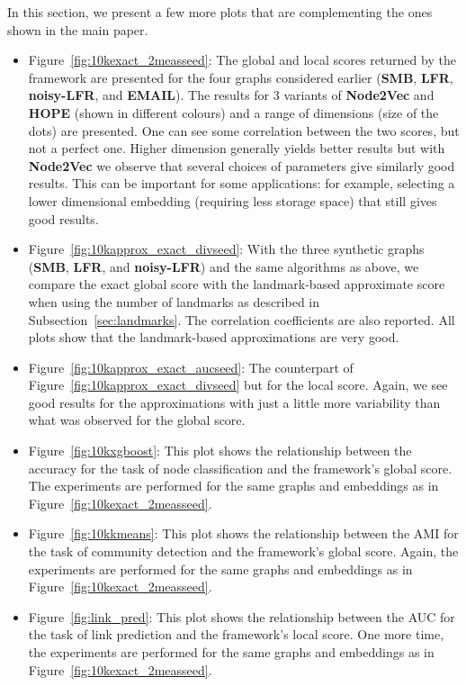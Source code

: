 In this section, we present a few more plots that are complementing the ones shown in the main paper. 
\begin{itemize}
    \item Figure~\ref{fig:10kexact_2measseed}: The global and local scores returned by the framework are presented for the four graphs considered earlier (\textbf{SMB}, \textbf{LFR}, \textbf{noisy-LFR}, and \textbf{EMAIL}). The results for 3 variants of \textbf{Node2Vec} and \textbf{HOPE} (shown in different colours) and a range of dimensions (size of the dots) are presented. One can see some correlation between the two scores, but not a perfect one. Higher dimension generally yields better results but with \textbf{Node2Vec} we observe that several choices of parameters give similarly good results. This can be important for some applications: for example, selecting a lower dimensional embedding (requiring less storage space) that still gives good results.
    \item Figure~\ref{fig:10kapprox_exact_divseed}: With the three synthetic graphs (\textbf{SMB}, \textbf{LFR}, and \textbf{noisy-LFR}) and the same algorithms as above, we compare the exact global score with the landmark-based approximate score when using the number of landmarks as described in Subsection~\ref{sec:landmarks}. The correlation coefficients are also reported. All plots show that the landmark-based approximations are very good. 
    \item Figure~\ref{fig:10kapprox_exact_aucseed}: The counterpart of Figure~\ref{fig:10kapprox_exact_divseed} but for the local score. Again, we see good results for the approximations with just a little more variability than what was observed for the global score.
    \item Figure~\ref{fig:10kxgboost}: This plot shows the relationship between the accuracy for the task of node classification and the framework's global score. The experiments are performed for the same graphs and embeddings as in Figure~\ref{fig:10kexact_2measseed}.
    \item Figure~\ref{fig:10kkmeans}: This plot shows the relationship between the AMI for the task of community detection and the framework's global score. Again, the experiments are performed for the same graphs and embeddings as in Figure~\ref{fig:10kexact_2measseed}.
    \item Figure~\ref{fig:link_pred}: This plot shows the relationship between the AUC for the task of link prediction and the framework's local score. One more time, the experiments are performed for the same graphs and embeddings as in Figure~\ref{fig:10kexact_2measseed}.
\end{itemize}

